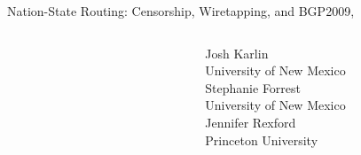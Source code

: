 \documentclass[ngerman,compress,hyperref={bookmarks}]{beamer}
\begin{document}
\begin{frame}{Nation-State Routing: Censorship, Wiretapping, and BGP}{2009, \cite{0903.3218v1}}
\begin{columns}[c]
\begin{column}{0.09\textwidth}
\begin{figure}
      \end{figure}
    \end{column}
    \begin{column}{0.3\textwidth}
      {\scriptsize Josh Karlin\\
      \vspace{0.1cm}
      University of New Mexico\\
      \vspace{0.7cm}
      Stephanie Forrest\\
      \vspace{0.1cm}
      University of New Mexico\\
      \vspace{0.5cm}
      Jennifer Rexford\\
      \vspace{0.1cm}
      Princeton University\\ }
    \end{column}
  \end{columns}
\end{frame}
\end{document}
